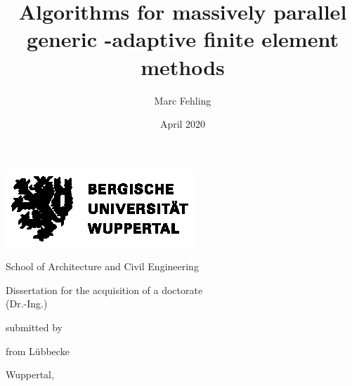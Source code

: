 \documentclass[10pt,a4paper,twoside,openright]{memoir}
\author{Marc Fehling}
\title{Algorithms for massively parallel generic \hp-adaptive finite element methods}
\date{April 2020}
\begin{document}
  \begin{titlingpage}
    \begin{center}
      \vspace*{\fill}
      \includegraphics[width=.75\textwidth]{logos/BUW_Logo-schwarz.eps}\bigskip
      \vspace*{\fill}\par
      {\Huge \thetitle\bigskip\par}
      \vspace*{\fill}\par
      {\Large School of Architecture and Civil Engineering\bigskip\par}
      {\Large Dissertation for the acquisition of a doctorate\\(Dr.-Ing.)\bigskip\par}
      {\Large submitted by\bigskip\par}
      {\LARGE \theauthor\par}
      {\Large from Lübbecke\bigskip\par}
      {\Large Wuppertal, \thedate\bigskip\bigskip\par}
    \end{center}
  \end{titlingpage}
  
  
  
  \frontmatter
  
  \thispagestyle{plain}
  
  \clearpage
  
  \thispagestyle{plain}
  \begin{otherlanguage}{ngerman}
    
  \end{otherlanguage}
  \clearpage
  
  \thispagestyle{plain}
  
  \clearpage
  
  \begin{KeepFromToc} %
    \tableofcontents
  \end{KeepFromToc}
  \cleardoublepage
  
  \listoffigures
  
\end{document}
